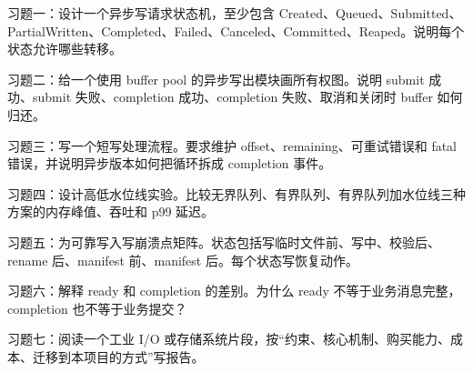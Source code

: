 \begin{exercisebox}
习题一：设计一个异步写请求状态机，至少包含 Created、Queued、Submitted、PartialWritten、Completed、Failed、Canceled、Committed、Reaped。说明每个状态允许哪些转移。

习题二：给一个使用 buffer pool 的异步写出模块画所有权图。说明 submit 成功、submit 失败、completion 成功、completion 失败、取消和关闭时 buffer 如何归还。

习题三：写一个短写处理流程。要求维护 offset、remaining、可重试错误和 fatal 错误，并说明异步版本如何把循环拆成 completion 事件。

习题四：设计高低水位线实验。比较无界队列、有界队列、有界队列加水位线三种方案的内存峰值、吞吐和 p99 延迟。

习题五：为可靠写入写崩溃点矩阵。状态包括写临时文件前、写中、校验后、rename 后、manifest 前、manifest 后。每个状态写恢复动作。

习题六：解释  ready 和  completion 的差别。为什么 ready 不等于业务消息完整，completion 也不等于业务提交？

习题七：阅读一个工业 I/O 或存储系统片段，按“约束、核心机制、购买能力、成本、迁移到本项目的方式”写报告。
\end{exercisebox}
